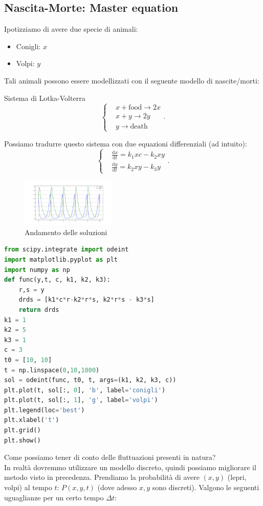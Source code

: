 \subsection{Nascita-Morte: Master equation}%
Ipotizziamo di avere due specie di animali:
\begin{itemize}
    \item Conigli: $x$ 
    \item Volpi: $y$ 
\end{itemize}
Tali animali possono essere modellizzati con il seguente modello di nascite/morti:
\begin{greenbox}{Sistema di Lotka-Volterra}
 \[
    \begin{cases}
	&x+\text{food}\to 2x\\
	&x+y\to 2y\\
	&y\to \text{death}
    \end{cases}
.\]    
\end{greenbox}
\noindent
Possiamo tradurre questo sistema con due equazioni differenziali (ad intuito):
\[
    \begin{cases}
	&\frac{\text{d} x}{\text{d} t} =k_1xc-k_2xy\\
	&\frac{\text{d} y}{\text{d} t} = k_2xy-k_3y
    \end{cases}
.\] 
\begin{figure}[H]
    \centering
    \includegraphics[width=0.4\textwidth]{figures/Volpi-Conigli.png}
    \caption{\scriptsize Andamento delle soluzioni}
    \label{fig:conigli}
\end{figure}
\begin{lstlisting}[language=Python]
from scipy.integrate import odeint
import matplotlib.pyplot as plt
import numpy as np
def func(y,t, c, k1, k2, k3):
    r,s = y 
    drds = [k1*c*r-k2*r*s, k2*r*s - k3*s]
    return drds
k1 = 1
k2 = 5
k3 = 1
c = 3
t0 = [10, 10]
t = np.linspace(0,10,1000)
sol = odeint(func, t0, t, args=(k1, k2, k3, c))
plt.plot(t, sol[:, 0], 'b', label='conigli')
plt.plot(t, sol[:, 1], 'g', label='volpi')
plt.legend(loc='best')
plt.xlabel('t')
plt.grid()
plt.show()
\end{lstlisting}
Come possiamo tener di conto delle fluttuazioni presenti in natura?\\
In realtà dovremmo utilizzare un modello discreto, quindi possiamo migliorare il metodo visto in precedenza. Prendiamo la probabilità di avere $(x,y)$ (lepri, volpi) al tempo $t$: $P(x,y,t)$ (dove adesso $x,y$ sono discreti). Valgono le seguenti uguaglianze per un certo tempo $\Delta t$:
